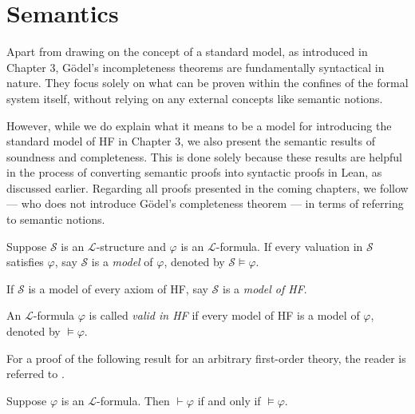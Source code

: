 \section{Semantics}

Apart from drawing on the concept of a standard model, as introduced in Chapter 3, 
Gödel's incompleteness theorems are fundamentally syntactical in nature. 
They focus solely on what can be proven within the confines of the formal system itself, 
without relying on any external concepts like semantic notions.

However, while we do explain what it means to be a model for introducing the standard model of 
HF in Chapter 3, we also present the semantic results of soundness and completeness. 
This is done solely because these results are helpful in the process of converting semantic proofs 
into syntactic proofs in Lean, as discussed earlier.
Regarding all proofs presented in the coming chapters, we follow 
\cite{swierczkowski2003finite} — who does not introduce Gödel's completeness theorem — 
in terms of referring to semantic notions.

\begin{definition}
    \label{def:models+Model+valid}
    \leanok
    Suppose $\mathcal{S}$ is an $\mathcal{L}$-structure and $\varphi$ is an $\mathcal{L}$-formula.
    If every valuation in $\mathcal{S}$ satisfies $\varphi$, 
    say $\mathcal{S}$ is a \textit{model} of $\varphi$, denoted by $\mathcal{S} \vDash \varphi$.

    If $\mathcal{S}$ is a model of every axiom of HF, say $\mathcal{S}$ is a \textit{model of HF}.
    
    An $\mathcal{L}$-formula $\varphi$ is called \textit{valid in HF} if 
    every model of HF is a model of $\varphi$, denoted by $\vDash \varphi$.
\end{definition}

For a proof of the following result for an arbitrary first-order theory, 
the reader is referred to  \cite{shoenfield1967mathematical}.

\begin{theorem}
    \label{thm:completeness}
    \leanok
    Suppose $\varphi$ is an $\mathcal{L}$-formula.
    Then $\vdash \varphi$ if and only if $\vDash \varphi$.
\end{theorem}


